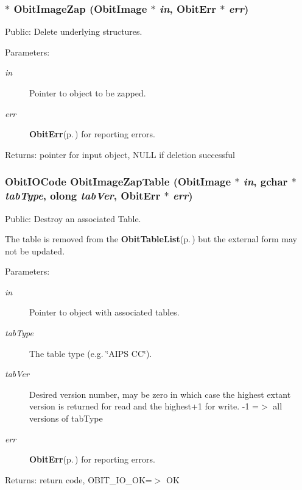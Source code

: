 \subsubsection{$\ast$ Obit\-Image\-Zap ({\bf Obit\-Image} $\ast$ {\em in}, {\bf Obit\-Err} $\ast$ {\em err})}\label{ObitImage_8c_a14}


Public: Delete underlying structures. 

\begin{Desc}
\item[Parameters:]
\begin{description}
\item[{\em in}]Pointer to object to be zapped. \item[{\em err}]{\bf Obit\-Err}{\rm (p.\,\pageref{structObitErr})} for reporting errors. \end{description}
\end{Desc}
\begin{Desc}
\item[Returns:]pointer for input object, NULL if deletion successful \end{Desc}
\subsubsection{\setlength{\rightskip}{0pt plus 5cm}Obit\-IOCode Obit\-Image\-Zap\-Table ({\bf Obit\-Image} $\ast$ {\em in}, gchar $\ast$ {\em tab\-Type}, {\bf olong} {\em tab\-Ver}, {\bf Obit\-Err} $\ast$ {\em err})}\label{ObitImage_8c_a28}


Public: Destroy an associated Table. 

The table is removed from the {\bf Obit\-Table\-List}{\rm (p.\,\pageref{structObitTableList})} but the external form may not be updated. \begin{Desc}
\item[Parameters:]
\begin{description}
\item[{\em in}]Pointer to object with associated tables. \item[{\em tab\-Type}]The table type (e.g. \char`\"{}AIPS CC\char`\"{}). \item[{\em tab\-Ver}]Desired version number, may be zero in which case the highest extant version is returned for read and the highest+1 for write. -1 =$>$ all versions of tab\-Type \item[{\em err}]{\bf Obit\-Err}{\rm (p.\,\pageref{structObitErr})} for reporting errors. \end{description}
\end{Desc}
\begin{Desc}
\item[Returns:]return code, OBIT\_\-IO\_\-OK=$>$ OK \end{Desc}
